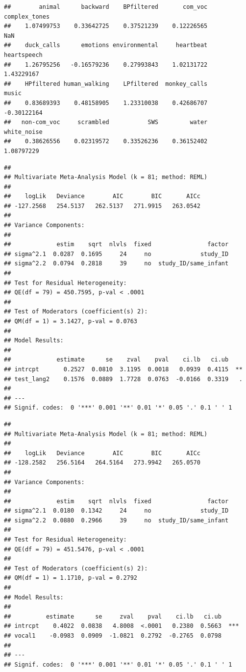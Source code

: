 \documentclass[]{apa6}
\begin{document}
\begin{verbatim}
##        animal      backward    BPfiltered       com_voc complex_tones 
##    1.07499753    0.33642725    0.37521239    0.12226565           NaN 
##    duck_calls      emotions environmental     heartbeat   heartspeech 
##    1.26795256   -0.16579236    0.27993843    1.02131722    1.43229167 
##    HPfiltered human_walking    LPfiltered  monkey_calls         music 
##    0.83689393    0.48158905    1.23310038    0.42686707   -0.30122164 
##   non-com_voc     scrambled           SWS         water   white_noise 
##    0.38626556    0.02319572    0.33526236    0.36152402    1.08797229
\end{verbatim}

\begin{verbatim}
## 
## Multivariate Meta-Analysis Model (k = 81; method: REML)
## 
##    logLik   Deviance        AIC        BIC       AICc  
## -127.2568   254.5137   262.5137   271.9915   263.0542  
## 
## Variance Components: 
## 
##             estim    sqrt  nlvls  fixed                factor
## sigma^2.1  0.0287  0.1695     24     no              study_ID
## sigma^2.2  0.0794  0.2818     39     no  study_ID/same_infant
## 
## Test for Residual Heterogeneity: 
## QE(df = 79) = 450.7595, p-val < .0001
## 
## Test of Moderators (coefficient(s) 2): 
## QM(df = 1) = 3.1427, p-val = 0.0763
## 
## Model Results:
## 
##             estimate      se    zval    pval    ci.lb   ci.ub    
## intrcpt       0.2527  0.0810  3.1195  0.0018   0.0939  0.4115  **
## test_lang2    0.1576  0.0889  1.7728  0.0763  -0.0166  0.3319   .
## 
## ---
## Signif. codes:  0 '***' 0.001 '**' 0.01 '*' 0.05 '.' 0.1 ' ' 1
\end{verbatim}

\begin{verbatim}
## 
## Multivariate Meta-Analysis Model (k = 81; method: REML)
## 
##    logLik   Deviance        AIC        BIC       AICc  
## -128.2582   256.5164   264.5164   273.9942   265.0570  
## 
## Variance Components: 
## 
##             estim    sqrt  nlvls  fixed                factor
## sigma^2.1  0.0180  0.1342     24     no              study_ID
## sigma^2.2  0.0880  0.2966     39     no  study_ID/same_infant
## 
## Test for Residual Heterogeneity: 
## QE(df = 79) = 451.5476, p-val < .0001
## 
## Test of Moderators (coefficient(s) 2): 
## QM(df = 1) = 1.1710, p-val = 0.2792
## 
## Model Results:
## 
##          estimate      se     zval    pval    ci.lb   ci.ub     
## intrcpt    0.4022  0.0838   4.8008  <.0001   0.2380  0.5663  ***
## vocal1    -0.0983  0.0909  -1.0821  0.2792  -0.2765  0.0798     
## 
## ---
## Signif. codes:  0 '***' 0.001 '**' 0.01 '*' 0.05 '.' 0.1 ' ' 1
\end{verbatim}
\end{document}
